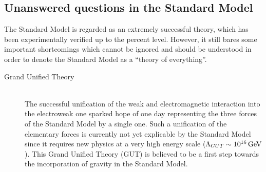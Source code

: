 \subsection{Unanswered questions in the Standard Model} \label{sec::QuestionsSM}
The Standard Model is regarded as an extremely successful theory, which has been experimentally verified up to the percent level. However, it still bares some important shortcomings which cannot be ignored and should be understood in order to denote the Standard Model as a ``theory of everything''. 

\begin{myindentpar}
  \begin{description}
    \item[Grand Unified Theory] \hfill \\
    The successful unification of the weak and electromagnetic interaction into the electroweak one sparked hope of one day representing the three forces of the Standard Model by a single one.
    Such a unification of the elementary forces is currently not yet explicable by the Standard Model since it requires new physics at a very high energy scale ($\Lambda_{GUT} \sim 10^{16} \, \mathrm{GeV}$).
    This Grand Unified Theory (GUT) is believed to be a first step towards the incorporation of gravity in the Standard Model.
    

\end{description}
\end{myindentpar}
